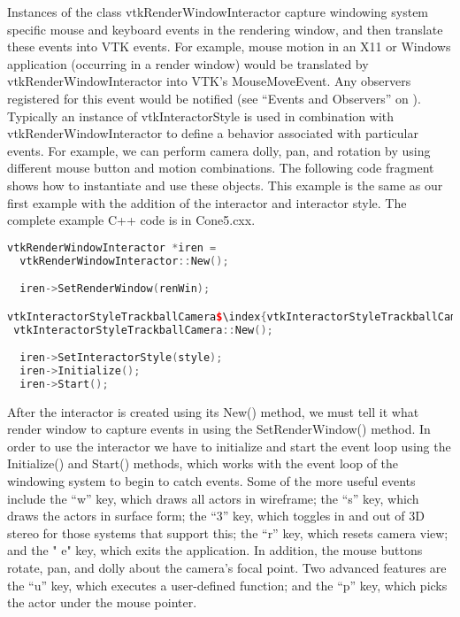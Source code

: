 \begin{description}[leftmargin=0cm,labelindent=0cm]
Instances of the class vtkRenderWindowInteractor capture windowing system specific mouse and keyboard events in the rendering window, and then translate these events into VTK events. For example, mouse motion in an X11 or Windows application (occurring in a render window) would be translated by vtkRenderWindowInteractor into VTK's MouseMoveEvent. Any observers registered for this event would be notified (see ``Events and Observers'' on \pageref{sub:examples_events_observers} ). Typically an instance of vtkInteractorStyle is used in combination with vtkRenderWindowInteractor to define a behavior associated with particular events. For example, we can perform camera dolly, pan, and rotation by using different mouse button and motion combinations. The following code fragment shows how to instantiate and use these objects. This example is the same as our first example with the addition of the interactor and interactor style. The complete example C++ code is in Cone5.cxx.

\begin{lstlisting}[language=C++, caption={Cone5.cxx}, escapechar=\$]
vtkRenderWindowInteractor *iren =
  vtkRenderWindowInteractor::New();

  iren->SetRenderWindow(renWin);

vtkInteractorStyleTrackballCamera$\index{vtkInteractorStyleTrackballCamera!example}$ *style =
 vtkInteractorStyleTrackballCamera::New();

  iren->SetInteractorStyle(style);
  iren->Initialize();
  iren->Start();
\end{lstlisting}

After the interactor is created using its New() method, we must tell it what render window to capture events in using the SetRenderWindow() method. In order to use the interactor we have to initialize and start the event loop using the Initialize() and Start() methods, which works with the event loop of the windowing system to begin to catch events. Some of the more useful events include the ``w'' key, which draws all actors in wireframe; the ``s'' key, which draws the actors in surface form; the ``3'' key, which toggles in and out of 3D stereo for those systems that support this; the ``r'' key, which resets camera view; and the " e" key, which exits the application. In addition, the mouse buttons rotate, pan, and dolly about the camera's focal point. Two advanced features are the ``u'' key, which executes a user-defined function; and the ``p'' key, which picks the actor under the mouse pointer.


\end{description}
